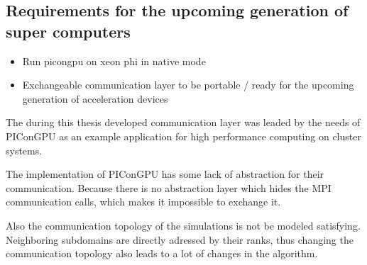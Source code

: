 \subsection{Requirements for the upcoming generation of super computers}
\begin{itemize}
\item Run picongpu on xeon phi in native mode
\item Exchangeable communication layer to be portable / ready for the
  upcoming generation of acceleration devices
\end{itemize}


The during this thesis developed communication layer was leaded by the
needs of PIConGPU as an example application for high performance
computing on cluster systems.

The implementation of PIConGPU has some lack of abstraction for their
communication. Because there is no abstraction layer which hides the
MPI communication calls, which makes it impossible to exchange it.

Also the communication topology of the simulations is not be modeled
satisfying. Neighboring subdomains are directly adressed by their
ranks, thus changing the communication topology also leads to a lot of
changes in the algorithm.



\cleardoublepage

